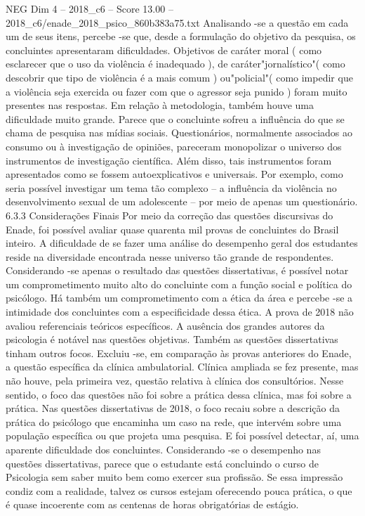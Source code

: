 \begin{textsample}{NEG Dim 4 – 2018\_c6 – Score 13.00 – 2018\_c6/enade\_2018\_psico\_860b383a75.txt}
Analisando -se a questão em cada um de seus itens, percebe -se que, desde a formulação do objetivo da pesquisa, os concluintes apresentaram dificuldades.
Objetivos de caráter moral ( como esclarecer que o uso da violência é inadequado ), de caráter"jornalístico"( como descobrir que tipo de violência é a mais comum ) ou"policial"( como impedir que a violência seja exercida ou fazer com que o agressor seja punido ) foram muito presentes nas respostas.
Em relação à metodologia, também houve uma dificuldade muito grande.
Parece que o concluinte sofreu a influência do que se chama de pesquisa nas mídias sociais.
Questionários, normalmente associados ao consumo ou à investigação de opiniões, pareceram monopolizar o universo dos instrumentos de investigação científica.
Além disso, tais instrumentos foram apresentados como se fossem autoexplicativos e universais.
Por exemplo, como seria possível investigar um tema tão complexo – a influência da violência no desenvolvimento sexual de um adolescente – por meio de apenas um questionário. 6.3.3 Considerações Finais Por meio da correção das questões discursivas do Enade, foi possível avaliar quase quarenta mil provas de concluintes do Brasil inteiro.
A dificuldade de se fazer uma análise do desempenho geral dos estudantes reside na diversidade encontrada nesse universo tão grande de respondentes.
Considerando -se apenas o resultado das questões dissertativas, é possível notar um comprometimento muito alto do concluinte com a função social e política do psicólogo.
Há também um comprometimento com a ética da área e percebe -se a intimidade dos concluintes com a especificidade dessa ética.
A prova de 2018 não avaliou referenciais teóricos específicos.
A ausência dos grandes autores da psicologia é notável nas questões objetivas.
Também as questões dissertativas tinham outros focos.
Excluiu -se, em comparação às provas anteriores do Enade, a questão específica da clínica ambulatorial.
Clínica ampliada se fez presente, mas não houve, pela primeira vez, questão relativa à clínica dos consultórios.
Nesse sentido, o foco das questões não foi sobre a prática dessa clínica, mas foi sobre a prática.
Nas questões dissertativas de 2018, o foco recaiu sobre a descrição da prática do psicólogo que encaminha um caso na rede, que intervém sobre uma população específica ou que projeta uma pesquisa.
E foi possível detectar, aí, uma aparente dificuldade dos concluintes.
Considerando -se o desempenho nas questões dissertativas, parece que o estudante está concluindo o curso de Psicologia sem saber muito bem como exercer sua profissão.
Se essa impressão condiz com a realidade, talvez os cursos estejam oferecendo pouca prática, o que é quase incoerente com as centenas de horas obrigatórias de estágio.

\end{textsample}
